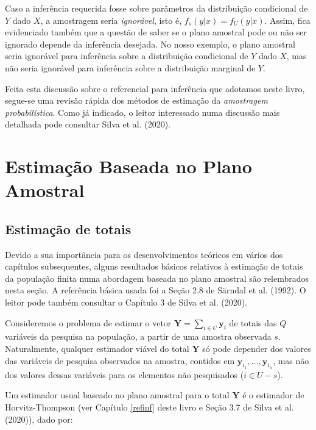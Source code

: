 \documentclass[
  12pt,
  brazilian,
]{book}
\theoremstyle{definition}
\theoremstyle{definition}
\theoremstyle{definition}
\theoremstyle{definition}
\theoremstyle{remark}
\begin{document}
Caso a inferência requerida fosse sobre parâmetros da distribuição condicional
de \(Y\) dado \(X\), a amostragem seria \emph{ignorável}, isto é, \(f_s ( y | x) = f_U (y | x)\).
Assim, fica evidenciado também que a questão de saber se o plano amostral pode
ou não ser ignorado depende da inferência desejada. No nosso exemplo, o plano amostral
seria ignorável para inferência sobre a distribuição condicional de \(Y\) dado \(X\),
mas não seria ignorável para inferência sobre a distribuição marginal de \(Y\).

Feita esta discussão sobre o referencial para inferência que adotamos neste
livro, segue-se uma revisão rápida dos métodos de estimação da \emph{amostragem probabilística}.
Como já indicado, o leitor interessado numa discussão mais detalhada pode consultar Silva et al. (2020).

\hypertarget{capplanamo}{%
\chapter{Estimação Baseada no Plano Amostral}\label{capplanamo}}

\hypertarget{estimatotais}{%
\section{Estimação de totais}\label{estimatotais}}

Devido a sua importância para os desenvolvimentos teóricos em vários dos capítulos subsequentes, alguns resultados básicos relativos à estimação de totais da população finita numa abordagem baseada no plano amostral são relembrados nesta seção. A referência básica usada foi a Seção 2.8 de Särndal et al. (1992). O leitor pode também consultar o Capítulo 3 de Silva et al. (2020).

Consideremos o problema de estimar o vetor \(\mathbf{Y} = \sum_{i \in U} \mathbf{y}_i\) de totais das \(Q\) variáveis da pesquisa na população, a partir de uma amostra observada \(s\). Naturalmente, qualquer estimador viável do total \(\mathbf{Y}\) só pode depender dos valores das variáveis de pesquisa observados na amostra, contidos em \(\mathbf{y}_{i_{1}}, \ldots , \mathbf{y}_{i_{n}}\), mas não dos valores dessas variáveis para os elementos não pesquisados (\(i \in U-s\)).

Um estimador usual baseado no plano amostral para o total \(\mathbf{Y}\) é o estimador de Horvitz-Thompson (ver Capítulo \ref{refinf} deste livro e Seção 3.7 de Silva et al. (2020)), dado por:
\end{document}
